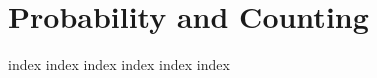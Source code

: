 \chapter{Probability and Counting}
\label{ch:pac}
\ifdefined\HCode
\else
{
\startcontents[chapter]
}
\fi

{index}
{index}
{index}
{index}
{index}
{index}

\ifdefined\HCode
{}
\fi

\ifdefined\HCode
\else
{
\stopcontents[chapter]
}
\fi

\ifdefined\HCode
{}
\fi

